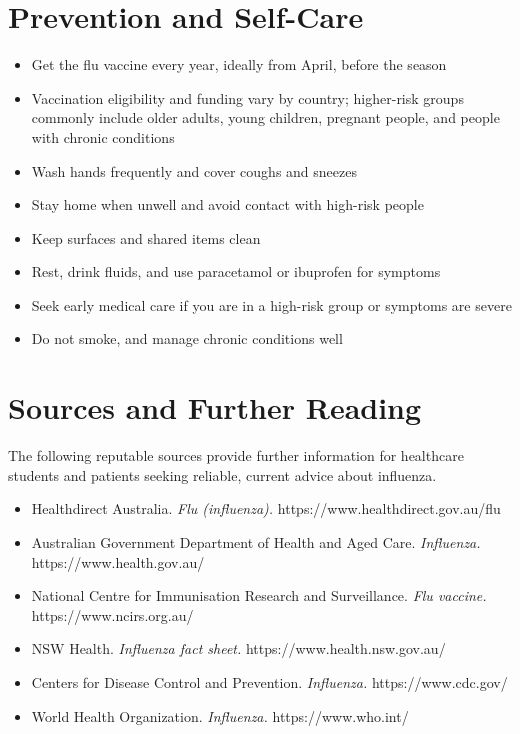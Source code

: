 \section*{Prevention and Self-Care}
\begin{itemize}
    \item Get the flu vaccine every year, ideally from April, before the season
    \item Vaccination eligibility and funding vary by country; higher-risk groups commonly include older adults, young children, pregnant people, and people with chronic conditions
    \item Wash hands frequently and cover coughs and sneezes
    \item Stay home when unwell and avoid contact with high-risk people
    \item Keep surfaces and shared items clean
    \item Rest, drink fluids, and use paracetamol or ibuprofen for symptoms
    \item Seek early medical care if you are in a high-risk group or symptoms are severe
    \item Do not smoke, and manage chronic conditions well
\end{itemize}

\section*{Sources and Further Reading}
The following reputable sources provide further information for healthcare students and patients seeking reliable, current advice about influenza.
\begin{itemize}
    \item Healthdirect Australia. \textit{Flu (influenza).} https://www.healthdirect.gov.au/flu
    \item Australian Government Department of Health and Aged Care. \textit{Influenza.} https://www.health.gov.au/
    \item National Centre for Immunisation Research and Surveillance. \textit{Flu vaccine.} https://www.ncirs.org.au/
    \item NSW Health. \textit{Influenza fact sheet.} https://www.health.nsw.gov.au/
    \item Centers for Disease Control and Prevention. \textit{Influenza.} https://www.cdc.gov/
    \item World Health Organization. \textit{Influenza.} https://www.who.int/
\end{itemize}
